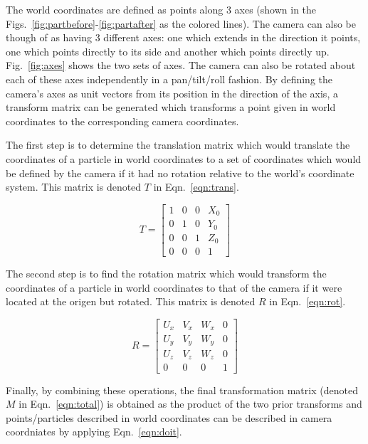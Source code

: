 \documentclass{article}
\begin{document}
The world coordinates are defined as points along 3 axes (shown in the Figs.~\ref{fig:partbefore}-\ref{fig:partafter}
 as the colored lines).
The camera can also be though of as having 3 different axes: one which extends in the direction it points, one which
points directly to its side and another which points directly up. Fig.~\ref{fig:axes} shows the two
sets of axes. The camera can also be rotated about each of these
axes independently in a pan/tilt/roll fashion. By defining the camera's axes as unit vectors from its position
in the direction of the axis, a transform matrix can be generated which transforms a point given in world coordinates
to the corresponding camera coordinates.

The first step is to determine the translation matrix which would translate the coordinates of a particle in world
coordinates to a set of coordinates which would be defined by the camera if it had no rotation relative to the world's
coordinate system. This matrix is denoted $T$ in Eqn.~\ref{eqn:trans}. 

\begin{equation}
T=
  \begin{bmatrix}
   1 & 0 & 0 & X_0 \\
   0 & 1 & 0 & Y_0 \\
   0 & 0 & 1 & Z_0 \\
   0 & 0 & 0 & 1
  \end{bmatrix}
  \label{eqn:trans}
\end{equation}


The second step is to find the rotation matrix 
which would transform the coordinates of a particle in world coordinates to that of the camera if it were located at 
the origen but rotated. This matrix is denoted $R$ in Eqn.~\ref{eqn:rot}.

\begin{equation}
R=
  \begin{bmatrix}
   U_x & V_x & W_x & 0 \\
   U_y & V_y & W_y & 0 \\
   U_z & V_z & W_z & 0 \\
   0 & 0 & 0 & 1
  \end{bmatrix}
  \label{eqn:rot}
\end{equation}

Finally, by combining these operations, the
final transformation matrix (denoted $M$ in Eqn.~\ref{eqn:total}) is obtained as the product of the two prior transforms
and points/particles described in world coordinates can be described in camera coordniates by applying Eqn.~\ref{eqn:doit}.
\end{document}
